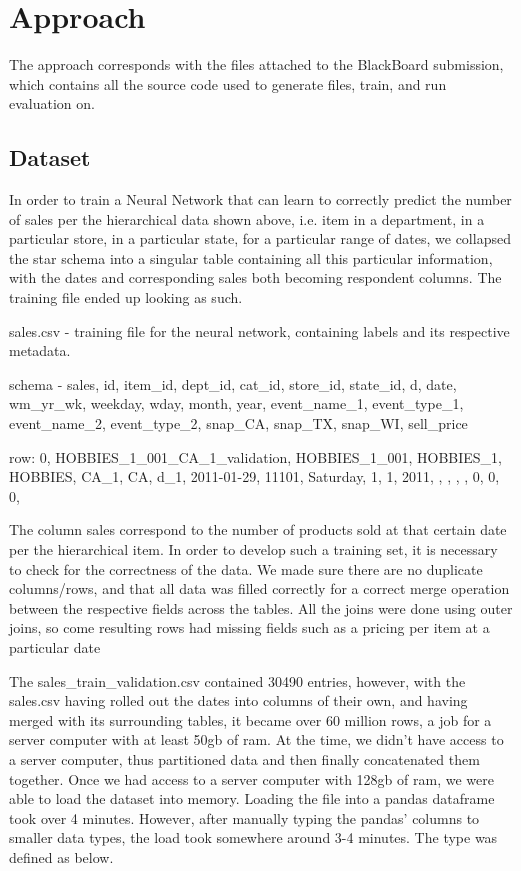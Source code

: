 \documentclass[10pt,twocolumn,letterpaper]{article}
\begin{document}
\section{Approach}
  The approach corresponds with the files attached to the BlackBoard submission,
  which contains all the source code used to generate files, train, and run
  evaluation on.

\subsection{Dataset}
In order to train a Neural Network that can learn to correctly predict the
number of sales per the hierarchical data shown above, i.e. item in a
department, in a particular store, in a particular state, for a particular range
of dates, we collapsed the star schema into a singular table containing all this
particular information, with the dates and corresponding sales both becoming
respondent columns. The training file ended up looking as such.

sales.csv - training file for the neural network, containing labels and its
respective metadata.

\noindent schema - sales, id, item\_id, dept\_id, cat\_id, store\_id, state\_id, d, date, wm\_yr\_wk, weekday, wday, month, year, event\_name\_1, event\_type\_1, event\_name\_2, event\_type\_2, snap\_CA, snap\_TX, snap\_WI, sell\_price

 \noindent row: 0, HOBBIES\_1\_001\_CA\_1\_validation, HOBBIES\_1\_001, HOBBIES\_1, HOBBIES, CA\_1, CA, d\_1, 2011-01-29, 11101, Saturday, 1, 1, 2011, , , , , 0, 0, 0,

The column sales correspond to the number of products sold at that certain date
per the hierarchical item. In order to develop such a training set, it is
necessary to check for the correctness of the data. We made sure there are no
duplicate columns/rows, and that all data was filled correctly for a correct
merge operation between the respective fields across the tables. All the joins
were done using outer joins, so come resulting rows had missing fields such as a
pricing per item at a particular date

 The sales\_train\_validation.csv contained 30490 entries, however, with the
sales.csv having rolled out the dates into columns of their own, and having
merged with its surrounding tables, it became over 60 million rows, a job for a
server computer with at least 50gb of ram. At the time, we didn’t have access to
a server computer, thus partitioned data and then finally concatenated them
together. Once we had access to a server computer with 128gb of ram, we were
able to load the dataset into memory. Loading the file into a pandas dataframe
took over 4 minutes. However, after manually typing the pandas’ columns to
smaller data types, the load took somewhere around 3-4 minutes. The type was
defined as below.
\end{document}
